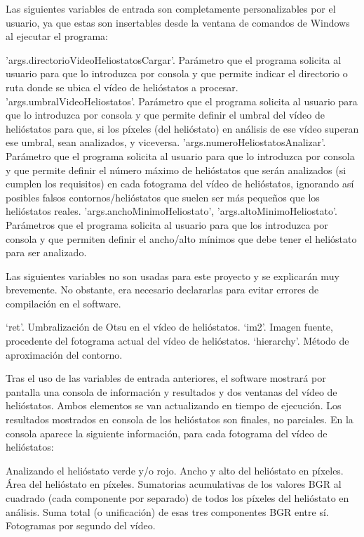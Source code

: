 \documentclass[12pt]{article}
\begin{document}
Las siguientes variables de entrada son completamente personalizables por el usuario, ya que estas son insertables desde la ventana de comandos de Windows al ejecutar el programa:

'args.directorioVideoHeliostatosCargar'. Parámetro que el programa solicita al usuario para que lo introduzca por consola y que permite indicar el directorio o ruta donde se ubica el vídeo de helióstatos a procesar.
'args.umbralVideoHeliostatos'. Parámetro que el programa solicita al usuario para que lo introduzca por consola y que permite definir el umbral del vídeo de helióstatos para que, si los píxeles (del helióstato) en análisis de ese vídeo superan ese umbral, sean analizados, y viceversa.
'args.numeroHeliostatosAnalizar'. Parámetro que el programa solicita al usuario para que lo introduzca por consola y que permite definir el número máximo de helióstatos que serán analizados (si cumplen los requisitos) en cada fotograma del vídeo de helióstatos, ignorando así posibles falsos contornos/helióstatos que suelen ser más pequeños que los helióstatos reales.
'args.anchoMinimoHeliostato', 'args.altoMinimoHeliostato'. Parámetros que el programa solicita al usuario para que los introduzca por consola y que permiten definir el ancho/alto mínimos que debe tener el helióstato para ser analizado.

Las siguientes variables no son usadas para este proyecto y se explicarán muy brevemente. No obstante, era necesario declararlas para evitar errores de compilación en el software.

‘ret’. Umbralización de Otsu en el vídeo de helióstatos.
‘im2’. Imagen fuente, procedente del fotograma actual del vídeo de helióstatos.
‘hierarchy’. Método de aproximación del contorno.

Tras el uso de las variables de entrada anteriores, el software mostrará por pantalla una consola de información y resultados y dos ventanas del vídeo de helióstatos. Ambos elementos se van actualizando en tiempo de ejecución. Los resultados mostrados en consola de los helióstatos son finales, no parciales. En la consola aparece la siguiente información, para cada fotograma del vídeo de helióstatos:

Analizando el helióstato verde y/o rojo.
Ancho y alto del helióstato en píxeles.
Área del helióstato en píxeles.
Sumatorias acumulativas de los valores BGR al cuadrado (cada componente por separado) de todos los píxeles del helióstato en análisis.
Suma total (o unificación) de esas tres componentes BGR entre sí.
Fotogramas por segundo del vídeo.
\end{document}
